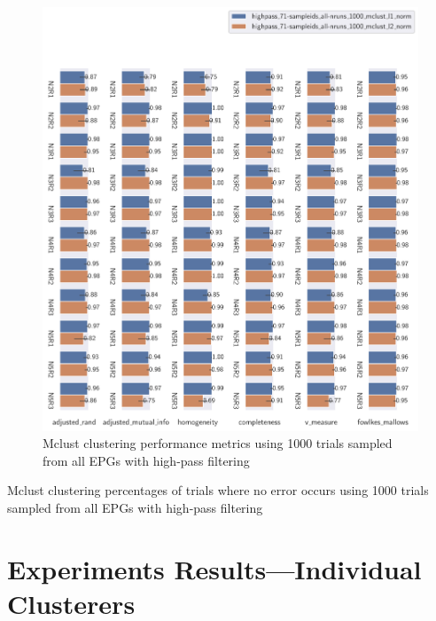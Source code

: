 \begin{theappendices}
\begin{figure}[H]
\centering
\includegraphics[width=\textwidth]{./figures/clust_comparison/highpass_71-sampleids_all-nruns_1000_mclust.pdf}
\caption{Mclust clustering performance metrics using 1000 trials sampled from all EPGs with high-pass filtering}
\label{fig:highpass_71-sampleids_all-nruns_1000_mclust}
\end{figure}

\begin{table}[H]
\centering
{}
\caption{Mclust clustering percentages of trials where no error occurs using 1000 trials sampled from all EPGs with high-pass filtering}
\label{table:highpass_71-sampleids_all-nruns_1000_mclust}
\end{table}

\section{Experiments Results---Individual Clusterers}


\end{theappendices}
